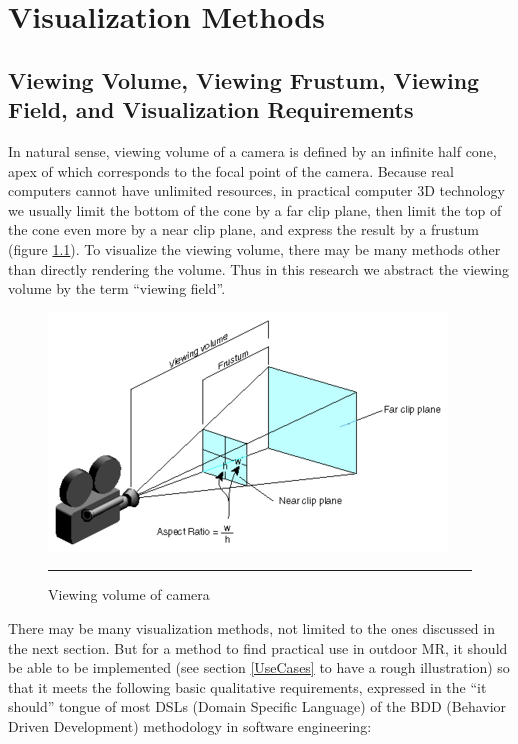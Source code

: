 \chapter{Visualization Methods}
\label{Chapter2}


\section{Viewing Volume, Viewing Frustum, Viewing Field, and Visualization Requirements}
\label{VisualizationRequirements}

In natural sense, viewing volume of a camera is defined by an infinite half cone, apex of which corresponds to the focal point of the camera. Because real computers cannot have unlimited resources, in practical computer 3D technology we usually limit the bottom of the cone by a far clip plane, then limit the top of the cone even more by a near clip plane, and express the result by a frustum (figure \ref{fig:ViewingVolume}). To visualize the viewing volume, there may be many methods other than directly rendering the volume. Thus in this research we abstract the viewing volume by the term ``viewing field''.

\begin{figure}[htbp]
	\centering
	\includegraphics{./Primitives/viewing_volume.png}
	\rule{35em}{0.5pt}
	\caption[Viewing volume of camera]{Viewing volume of camera}
	\label{fig:ViewingVolume}
\end{figure}

There may be many visualization methods, not limited to the ones discussed in the next section. But for a method to find practical use in outdoor MR, it should be able to be implemented (see section \ref{UseCases} to have a rough illustration) so that it meets the following basic qualitative requirements, expressed in the ``it should'' tongue of most DSLs (Domain Specific Language) of the BDD (Behavior Driven Development) methodology in software engineering:

